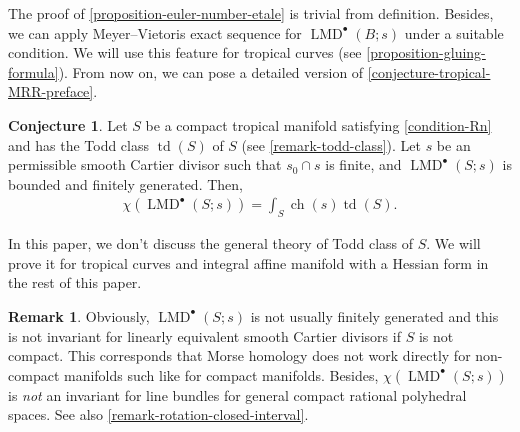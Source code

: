 \documentclass[a4paper,dvipdfmx,reqno,12pt]{amsart}
\theoremstyle{definition}
\newtheorem{conjecture}[theorem]{Conjecture}
\newtheorem{remark}[theorem]{Remark}
\newcommand{\opn}[1]{\operatorname{#1}}
\numberwithin{equation}{section}
\begin{document}
The proof of \cref{proposition-euler-number-etale} is trivial from definition.
Besides, we can apply Meyer--Vietoris exact sequence 
for $\opn{LMD}^{\bullet}(B;s)$ under a suitable condition.
We will use this feature for tropical curves (see
\cref{proposition-gluing-formula}).
From now on, we can pose a detailed version of 
\cref{conjecture-tropical-MRR-preface}.
\begin{conjecture} 
\label{conjecture-tropical-MRR}
Let $S$ be a compact tropical manifold satisfying 
\cref{condition-Rn} and has the Todd class $\opn{td}(S)$ 
of $S$ (see \cref{remark-todd-class}).
Let $s$ be an permissible smooth Cartier divisor such that
$s_0\cap s$ is finite, and $\opn{LMD}^{\bullet}(S;s)$ 
is bounded and finitely generated. Then, 
\begin{align}
\chi(\opn{LMD}^{\bullet}(S;s))=\int_{S}\opn{ch}(s)\opn{td}(S).
\end{align}
\end{conjecture}
In this paper, we don't discuss the general theory of 
Todd class of $S$.
We will prove it for tropical curves and integral 
affine manifold with a Hessian form in the 
rest of this paper.

\begin{remark}
Obviously, $\opn{LMD}^{\bullet}(S;s)$ is not usually 
finitely generated and this is not invariant 
for linearly equivalent smooth Cartier divisors
if $S$ is not compact.
This corresponds that Morse homology does not work directly
for non-compact manifolds such 
like for compact manifolds.
Besides, $\chi(\opn{LMD}^{\bullet}(S;s))$ is \emph{not}
an invariant for line bundles for general compact rational 
polyhedral spaces. See also 
\cref{remark-rotation-closed-interval}.  
\end{remark}
\end{document}
